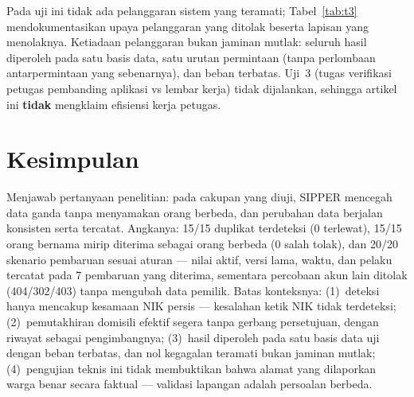 \documentclass[11pt,a4paper]{article}
\begin{document}
Pada uji ini tidak ada pelanggaran sistem yang teramati; Tabel~\ref{tab:t3} mendokumentasikan upaya pelanggaran yang ditolak beserta lapisan yang menolaknya. Ketiadaan pelanggaran bukan jaminan mutlak: seluruh hasil diperoleh pada satu basis data, satu urutan permintaan (tanpa perlombaan antarpermintaan yang sebenarnya), dan beban terbatas. Uji~3 (tugas verifikasi petugas pembanding aplikasi vs lembar kerja) tidak dijalankan, sehingga artikel ini \textbf{tidak} mengklaim efisiensi kerja petugas.

\section{Kesimpulan}

Menjawab pertanyaan penelitian: pada cakupan yang diuji, SIPPER mencegah data ganda tanpa menyamakan orang berbeda, dan perubahan data berjalan konsisten serta tercatat. Angkanya: 15/15 duplikat terdeteksi (0 terlewat), 15/15 orang bernama mirip diterima sebagai orang berbeda (0 salah tolak), dan 20/20 skenario pembaruan sesuai aturan --- nilai aktif, versi lama, waktu, dan pelaku tercatat pada 7 pembaruan yang diterima, sementara percobaan akun lain ditolak (404/302/403) tanpa mengubah data pemilik. Batas konteksnya: (1)~deteksi hanya mencakup kesamaan NIK persis --- kesalahan ketik NIK tidak terdeteksi; (2)~pemutakhiran domisili efektif segera tanpa gerbang persetujuan, dengan riwayat sebagai pengimbangnya; (3)~hasil diperoleh pada satu basis data uji dengan beban terbatas, dan nol kegagalan teramati bukan jaminan mutlak; (4)~pengujian teknis ini tidak membuktikan bahwa alamat yang dilaporkan warga benar secara faktual --- validasi lapangan adalah persoalan berbeda.
\end{document}
